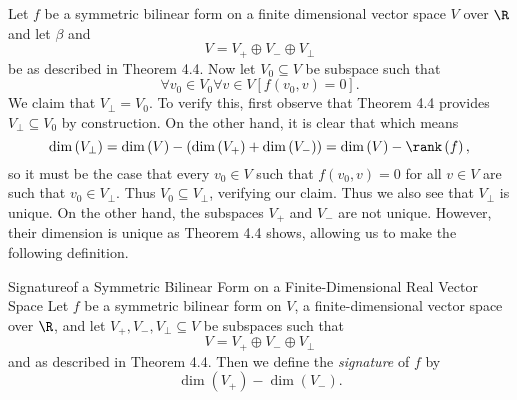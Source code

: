 \documentclass[linearalgebraII]{subfiles}
\begin{document}
    \begin{remark}
        Let $f$ be a symmetric bilinear form on a finite dimensional vector space $V$ over $\R$ and let $\beta$ and 
        \begin{equation*}
            V = V_+\oplus V_-\oplus V_\perp
        \end{equation*}
        be as described in Theorem 4.4. Now let $V_0\subseteq V$ be subspace such that
        \begin{equation*}
            \forall v_0\in V_0\forall v\in V \left[ f\left( v_0,v \right) = 0 \right] .
        \end{equation*}
        We claim that $V_\perp = V_0$. To verify this, first observe that Theorem 4.4 provides $V_\perp\subseteq V_0$ by construction. On the other hand, it is clear that
        which means
        \begin{equation*}
            \dim\left( V_\perp \right) = \dim\left( V \right) - \left( \dim\left( V_+ \right) + \dim\left( V_- \right)  \right) = \dim\left( V \right) -\rank\left( f \right) ,
        \end{equation*}
        so it must be the case that every $v_0\in V$ such that $f\left( v_0,v \right) = 0$ for all $v\in V$ are such that $v_0\in V_\perp$. Thus $V_0\subseteq V_\perp$, verifying our claim. Thus we also see that $V_\perp$ is unique. On the other hand, the subspaces $V_+$ and $V_-$ are not unique. However, their dimension is unique as Theorem 4.4 shows, allowing us to make the following definition.
    \end{remark}

    \begin{definition}{Signature}{of a Symmetric Bilinear Form on a Finite-Dimensional Real Vector Space}
        Let $f$ be a symmetric bilinear form on $V$, a finite-dimensional vector space over $\R$, and let $V_+, V_-, V_\perp\subseteq V$ be subspaces such that
        \begin{equation*}
            V = V_+\oplus V_-\oplus V_\perp
        \end{equation*}
        and as described in Theorem 4.4. Then we define the \emph{signature} of $f$ by
        \begin{equation*}
            \dim\left( V_+ \right) - \dim\left( V_- \right).
        \end{equation*}
    \end{definition}
\end{document}
